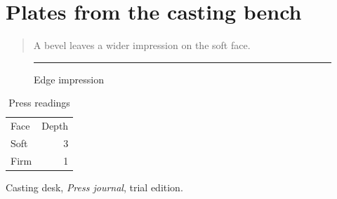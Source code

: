 \documentclass{article}
\begin{document}
\section*{Plates from the casting bench}

\begin{abstract}A bevel leaves a wider impression on the soft face.\end{abstract}
\begin{figure}[h]\centering\rule{4cm}{3pt}\caption{Edge impression}\end{figure}
\begin{table}[h]\centering\begin{tabular}{lr}Face&Depth\\Soft&3\\Firm&1\end{tabular}\caption{Press readings}\end{table}
\begin{thebibliography}{1}Casting desk, \emph{Press journal}, trial edition.\end{thebibliography}
\end{document}
